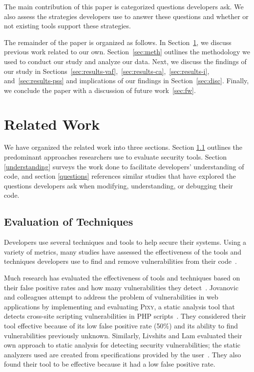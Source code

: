 \documentclass[conference]{IEEEtran}
\begin{document}
The main contribution of this paper is categorized questions developers ask. 
We also assess the strategies developers use to answer these questions and whether or not existing tools support these strategies.

The remainder of the paper is organized as follows. 
In Section~\ref{sec:rw}, we discuss previous work related to our own. 
Section~\ref{sec:meth} outlines the methodology we used to conduct our study and analyze our data. 
Next, we discuss the findings of our study in Sections~\ref{sec:results-vaf},~\ref{sec:results-ca},~\ref{sec:results-i}, and~\ref{sec:results-pss} and implications of our findings in Section~\ref{sec:disc}.
Finally, we conclude the paper with a discussion of future work~\ref{sec:fw}.







\section{Related Work}
\label{sec:rw}

We have organized the related work into three sections. Section \ref{evaluation} outlines the predominant approaches researchers use to evaluate security tools. 
Section \ref{understanding} surveys the work done to facilitate developers' understanding of code, and section \ref{questions} references similar studies that have explored the questions developers ask when modifying, understanding, or debugging their code.

\subsection{Evaluation of Techniques}
\label{evaluation}
Developers use several techniques and tools to help secure their systems.
Using a variety of metrics, many studies have assessed the effectiveness of the tools and techniques developers use to find and remove vulnerabilities from their code~\cite{martin2005finding, austin2011one, livshits2005finding}.  

Much research has evaluated the effectiveness of tools and techniques based on their false positive rates and how many vulnerabilities they detect~\cite{jovanovic2006pixy, austin2011one, dukes2013case}. 
Jovanovic and colleagues attempt to address the problem of vulnerabilities in web applications by implementing and evaluating \textsc{Pixy}, a static analysis tool that detects cross-site scripting vulnerabilities in PHP scripts~\cite{jovanovic2006pixy}. 
They considered their tool effective because of its low false positive rate (50\%) and its ability to find vulnerabilities previously unknown. 
Similarly, Livshits and Lam evaluated their own approach to static analysis for detecting security vulnerabilities; the static analyzers used are created from specifications provided by the user~\cite{livshits2005finding}. 
They also found their tool to be effective because it had a low false positive rate. 
\end{document}
